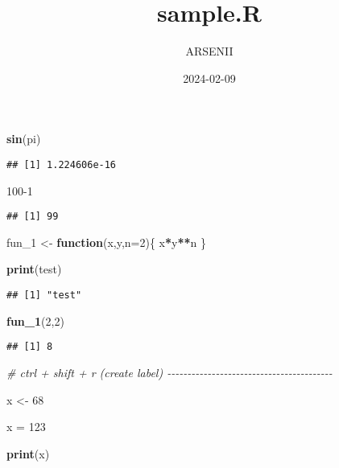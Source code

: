 \documentclass[
]{article}
\title{sample.R}
\author{ARSENII}
\date{2024-02-09}
\newenvironment{Shaded}{\begin{snugshade}}{\end{snugshade}}
\newcommand{\AttributeTok}[1]{\textcolor[rgb]{0.13,0.29,0.53}{#1}}
\newcommand{\CommentTok}[1]{\textcolor[rgb]{0.56,0.35,0.01}{\textit{#1}}}
\newcommand{\ControlFlowTok}[1]{\textcolor[rgb]{0.13,0.29,0.53}{\textbf{#1}}}
\newcommand{\DecValTok}[1]{\textcolor[rgb]{0.00,0.00,0.81}{#1}}
\newcommand{\FunctionTok}[1]{\textcolor[rgb]{0.13,0.29,0.53}{\textbf{#1}}}
\newcommand{\NormalTok}[1]{#1}
\newcommand{\OtherTok}[1]{\textcolor[rgb]{0.56,0.35,0.01}{#1}}
\newcommand{\SpecialCharTok}[1]{\textcolor[rgb]{0.81,0.36,0.00}{\textbf{#1}}}
\newcommand{\StringTok}[1]{\textcolor[rgb]{0.31,0.60,0.02}{#1}}
\begin{document}
\maketitle

\begin{Shaded}
\begin{Highlighting}[]
\FunctionTok{sin}\NormalTok{(pi)}
\end{Highlighting}
\end{Shaded}

\begin{verbatim}
## [1] 1.224606e-16
\end{verbatim}

\begin{Shaded}
\begin{Highlighting}[]
\DecValTok{100{-}1}
\end{Highlighting}
\end{Shaded}

\begin{verbatim}
## [1] 99
\end{verbatim}

\begin{Shaded}
\begin{Highlighting}[]
\NormalTok{fun\_1 }\OtherTok{\textless{}{-}} \ControlFlowTok{function}\NormalTok{(x,y,}\AttributeTok{n=}\DecValTok{2}\NormalTok{)\{}
\NormalTok{  x}\SpecialCharTok{*}\NormalTok{y}\SpecialCharTok{**}\NormalTok{n}
\NormalTok{\}}

\FunctionTok{print}\NormalTok{(}\StringTok{\textquotesingle{}test\textquotesingle{}}\NormalTok{)}
\end{Highlighting}
\end{Shaded}

\begin{verbatim}
## [1] "test"
\end{verbatim}

\begin{Shaded}
\begin{Highlighting}[]
\FunctionTok{fun\_1}\NormalTok{(}\DecValTok{2}\NormalTok{,}\DecValTok{2}\NormalTok{)}
\end{Highlighting}
\end{Shaded}

\begin{verbatim}
## [1] 8
\end{verbatim}

\begin{Shaded}
\begin{Highlighting}[]
\CommentTok{\# ctrl + shift + r (create label) {-}{-}{-}{-}{-}{-}{-}{-}{-}{-}{-}{-}{-}{-}{-}{-}{-}{-}{-}{-}{-}{-}{-}{-}{-}{-}{-}{-}{-}{-}{-}{-}{-}{-}{-}{-}{-}{-}{-}{-}{-}}

\NormalTok{x }\OtherTok{\textless{}{-}} \DecValTok{68}

\NormalTok{x }\OtherTok{=} \StringTok{\textquotesingle{}123\textquotesingle{}}

\FunctionTok{print}\NormalTok{(x)}
\end{Highlighting}
\end{Shaded}
\end{document}
